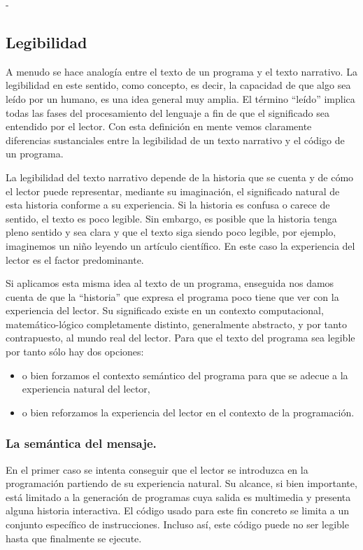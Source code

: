 \documentclass{llncs}
\begin{document}
-\subsection{Legibilidad}
\label{subsec:readability}
A menudo se hace analogía entre el texto de un programa y el texto narrativo. La legibilidad en este sentido, como concepto, es decir, la capacidad de que algo sea leído por un humano, es una idea general muy amplia. El término ``leído'' implica todas las fases del procesamiento del lenguaje a fin de que el significado sea entendido por el lector. Con esta definición en mente vemos claramente diferencias sustanciales entre la legibilidad de un texto narrativo y el código de un programa. 

La legibilidad del texto narrativo depende de la historia que se cuenta y de cómo el lector puede representar, mediante su imaginación, el significado natural de esta historia conforme a su experiencia. Si la historia es confusa o carece de sentido, el texto es poco legible. Sin embargo, es posible que la historia tenga pleno sentido y sea clara y que el texto siga siendo poco legible, por ejemplo, imaginemos un niño leyendo un artículo científico. En este caso la experiencia del lector es el factor predominante. 

Si aplicamos esta misma idea al texto de un programa, enseguida nos damos cuenta de que la ``historia'' que expresa el programa poco tiene que ver con la experiencia del lector. Su significado existe en un contexto computacional, matemático-lógico completamente distinto, generalmente abstracto, y por tanto contrapuesto, al mundo real del lector. Para que el texto del programa sea legible por tanto sólo hay dos opciones: 

\begin{itemize}
\item o bien forzamos el contexto semántico del programa para que se adecue a la experiencia natural del lector, 
\item o bien reforzamos la experiencia del lector en el contexto de la programación. 
\end{itemize}

\subsubsection{La semántica del mensaje.}
\label{subsec:message}

En el primer caso se intenta conseguir que el lector se introduzca en la programación partiendo de su experiencia natural. Su alcance, si bien importante, está limitado a la generación de programas cuya salida es multimedia y presenta alguna historia interactiva. El código usado para este fin concreto se limita a un conjunto específico de instrucciones. Incluso así, este código puede no ser legible hasta que finalmente se ejecute. 
\end{document}
